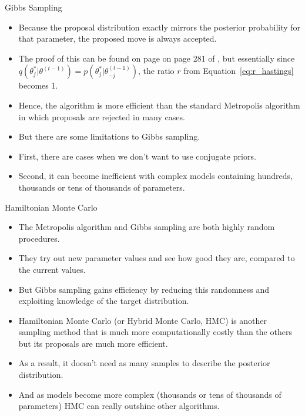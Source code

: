 \documentclass[handout]{beamer}
\begin{document}
\begin{frame}{Gibbs Sampling}
\scriptsize{

\begin{itemize}

\item Because the proposal distribution exactly mirrors the posterior probability for that parameter, the proposed move is always accepted.

\item The proof of this can be found on page on page 281 of \cite{gelman2013bayesian}, but essentially since $q(\theta^{*}_j|\theta^{(t-1)}) = p(\theta^{*}_j | \theta^{(t-1)}_{-j})$, the ratio $r$ from Equation~\ref{eq:r_hastings} becomes 1.


\item Hence, the algorithm is more efficient than the standard Metropolis algorithm in which proposals are rejected in many cases.

\item But there are some limitations to Gibbs sampling.

\item First, there are cases when we don't want to use conjugate priors. 

\item Second, it can become inefficient with complex models containing hundreds, thousands or tens of thousands of parameters.


\end{itemize}


} 
\end{frame}



\begin{frame}{Hamiltonian Monte Carlo}
\scriptsize{

\begin{itemize}
\item The Metropolis algorithm and Gibbs sampling are both highly random procedures.
\item They try out new parameter values and see how good they are, compared to the current values.
\item But Gibbs sampling gains efficiency by reducing this randomness and exploiting knowledge of the target distribution. 

\item Hamiltonian Monte Carlo (or Hybrid Monte Carlo, HMC) is another sampling method that is much more computationally costly than the others but its proposals are much more efficient.

\item As a result, it doesn't need as many samples to describe the posterior distribution. 
\item And as models become more complex (thousands or tens of thousands of parameters) HMC can really outshine other algorithms.

\end{itemize}


} 
\end{frame}
\end{document}
